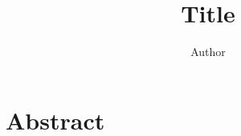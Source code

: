\documentclass{article}
\title{Title}
\author{Author}
\begin{document}
\maketitle

\section{Abstract}
\end{document}
